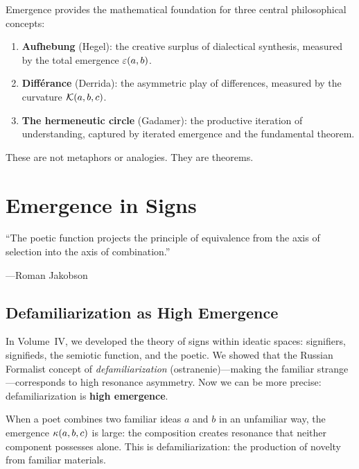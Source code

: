 Emergence provides the mathematical foundation for three central philosophical
concepts:

\begin{enumerate}
  \item \textbf{Aufhebung} (Hegel): the creative surplus of dialectical synthesis,
    measured by the total emergence $\varepsilon(a,b)$.
  \item \textbf{Diff\'erance} (Derrida): the asymmetric play of differences,
    measured by the curvature $\mathcal{K}(a,b,c)$.
  \item \textbf{The hermeneutic circle} (Gadamer): the productive iteration of
    understanding, captured by iterated emergence and the fundamental theorem.
\end{enumerate}

These are not metaphors or analogies. They are theorems.



\chapter{Emergence in Signs}
\label{ch:emergence-signs}

\epigraph{``The poetic function projects the principle of equivalence from
the axis of selection into the axis of combination.''}
{---Roman Jakobson}


\section{Defamiliarization as High Emergence}

In Volume~IV, we developed the theory of signs within ideatic spaces: signifiers,
signifieds, the semiotic function, and the poetic. We showed that the Russian
Formalist concept of \emph{defamiliarization} (ostranenie)---making the familiar
strange---corresponds to high resonance asymmetry. Now we can be more precise:
defamiliarization is \textbf{high emergence}.

When a poet combines two familiar ideas $a$ and $b$ in an unfamiliar way, the
emergence $\kappa(a, b, c)$ is large: the composition creates resonance that
neither component possesses alone. This is defamiliarization: the production of
novelty from familiar materials.

